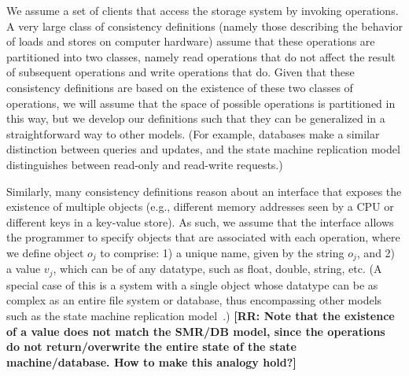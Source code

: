 \documentclass{sig-alternate-05-2015}
\begin{document}
We assume a set of clients that access the storage system by invoking operations. A very large class of consistency definitions (namely those describing the behavior of loads and stores on computer hardware) assume that these operations are partitioned into two classes, namely read operations that do not affect the result of subsequent operations and write operations that do. Given that these consistency definitions are based on the existence of these two classes of operations, we will assume that the space of possible operations is partitioned in this way, but we develop our definitions such that they can be generalized in a straightforward way to other models. (For example, databases make a similar distinction between queries and updates, and the state machine replication model distinguishes between read-only and read-write requests.)

Similarly, many consistency definitions reason about an interface that exposes the existence of multiple objects (e.g., different memory addresses seen by a CPU or different keys in a key-value store). As such, we assume that the interface allows the programmer to specify objects that are associated with each operation, where we define object $o_j$ to comprise: 1) a unique name, given by the string $o_j$, and 2) a value $v_j$, which can be of any datatype, such as float, double, string, etc. (A special case of this is a system with a single object whose datatype can be as complex as an entire file system or database, thus encompassing other models such as the state machine replication model~\cite{schneider:smr:tutorial}.) {\bf [RR: Note that the existence of a value does not match the SMR/DB model, since the operations do not return/overwrite the entire state of the state machine/database. How to make this analogy hold?]}
\end{document}
